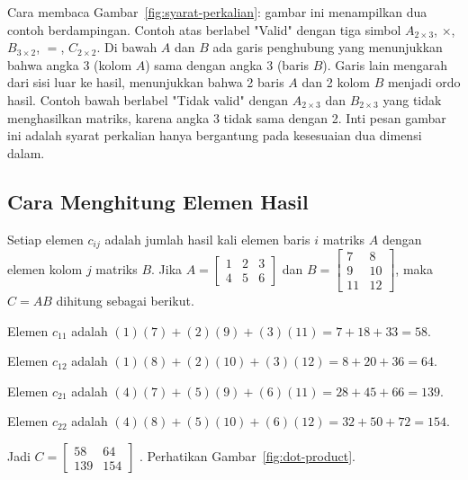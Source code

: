 \documentclass[11pt,a4paper]{article}
\begin{document}
Cara membaca Gambar~\ref{fig:syarat-perkalian}: gambar ini menampilkan dua contoh berdampingan. Contoh atas berlabel "Valid" dengan tiga simbol $A_{2\times 3}$, $\times$, $B_{3\times 2}$, $=$, $C_{2\times 2}$. Di bawah $A$ dan $B$ ada garis penghubung yang menunjukkan bahwa angka 3 (kolom $A$) sama dengan angka 3 (baris $B$). Garis lain mengarah dari sisi luar ke hasil, menunjukkan bahwa 2 baris $A$ dan 2 kolom $B$ menjadi ordo hasil. Contoh bawah berlabel "Tidak valid" dengan $A_{2\times 3}$ dan $B_{2\times 3}$ yang tidak menghasilkan matriks, karena angka 3 tidak sama dengan 2. Inti pesan gambar ini adalah syarat perkalian hanya bergantung pada kesesuaian dua dimensi dalam.

\subsection{Cara Menghitung Elemen Hasil}

Setiap elemen $c_{ij}$ adalah jumlah hasil kali elemen baris $i$ matriks $A$ dengan elemen kolom $j$ matriks $B$. Jika $A=\begin{bmatrix}1&2&3\\4&5&6\end{bmatrix}$ dan $B=\begin{bmatrix}7&8\\9&10\\11&12\end{bmatrix}$, maka $C=AB$ dihitung sebagai berikut.

Elemen $c_{11}$ adalah $(1)(7)+(2)(9)+(3)(11)=7+18+33=58$.

Elemen $c_{12}$ adalah $(1)(8)+(2)(10)+(3)(12)=8+20+36=64$.

Elemen $c_{21}$ adalah $(4)(7)+(5)(9)+(6)(11)=28+45+66=139$.

Elemen $c_{22}$ adalah $(4)(8)+(5)(10)+(6)(12)=32+50+72=154$.

Jadi $C=\begin{bmatrix}58&64\\139&154\end{bmatrix}$ \cite{lipschutz}. Perhatikan Gambar~\ref{fig:dot-product}.
\end{document}
